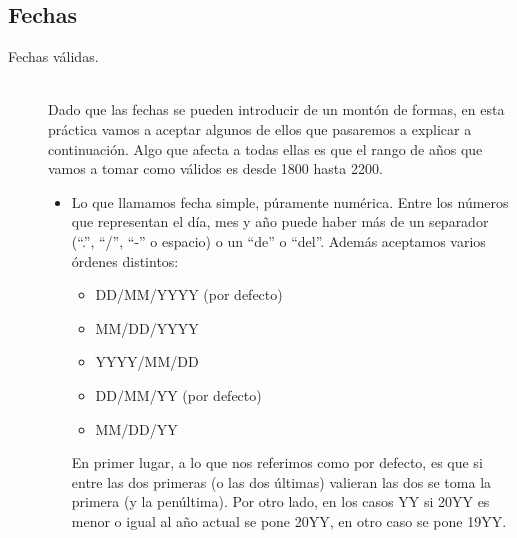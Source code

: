 \documentclass[12pt]{article}
\begin{document}
    \subsection{Fechas}
    \begin{description}
        \item [Fechas válidas.]~\\
            Dado que las fechas se pueden introducir de un montón de formas, en esta práctica vamos a aceptar algunos de ellos que pasaremos a explicar a continuación. Algo que afecta a todas ellas es que el rango de años que vamos a tomar como válidos es desde 1800 hasta 2200.
            \begin{itemize}
                \item Lo que llamamos fecha simple, púramente numérica. Entre los números que representan el día, mes y año puede haber más de un separador (``.'', ``/'', ``-'' o espacio) o un ``de'' o ``del''. Además aceptamos varios órdenes distintos:
                    \begin{itemize}
                        \item DD/MM/YYYY (por defecto)
                        \item MM/DD/YYYY
                        \item YYYY/MM/DD
                        \item DD/MM/YY (por defecto)
                        \item MM/DD/YY
                    \end{itemize}
                    En primer lugar, a lo que nos referimos como por defecto, es que si entre las dos primeras (o las dos últimas) valieran las dos se toma la primera (y la penúltima). Por otro lado, en los casos YY si 20YY es menor o igual al año actual se pone 20YY, en otro caso se pone 19YY. 


\end{itemize}
\end{description}
\end{document}
